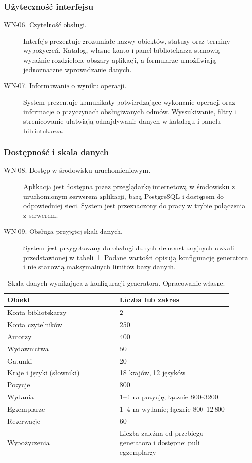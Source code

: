 \documentclass[11pt, a4paper]{article}
\begin{document}
\subsubsection{Użyteczność interfejsu}

\begin{description}
\item[WN-06. Czytelność obsługi.] Interfejs prezentuje zrozumiałe nazwy obiektów, statusy oraz terminy wypożyczeń. Katalog, własne konto i panel bibliotekarza stanowią wyraźnie rozdzielone obszary aplikacji, a formularze umożliwiają jednoznaczne wprowadzanie danych.
\item[WN-07. Informowanie o wyniku operacji.] System prezentuje komunikaty potwierdzające wykonanie operacji oraz informacje o przyczynach obsługiwanych odmów. Wyszukiwanie, filtry i stronicowanie ułatwiają odnajdywanie danych w katalogu i panelu bibliotekarza.
\end{description}

\subsubsection{Dostępność i skala danych}

\begin{description}
\item[WN-08. Dostęp w środowisku uruchomieniowym.] Aplikacja jest dostępna przez przeglądarkę internetową w środowisku z uruchomionym serwerem aplikacji, bazą PostgreSQL i dostępem do odpowiedniej sieci. System jest przeznaczony do pracy w trybie połączenia z serwerem.
\item[WN-09. Obsługa przyjętej skali danych.] System jest przygotowany do obsługi danych demonstracyjnych o skali przedstawionej w tabeli~\ref{tab:rozmiar-bazy}. Podane wartości opisują konfigurację generatora i nie stanowią maksymalnych limitów bazy danych.
\end{description}

\begin{table}[htbp]
\centering
\caption{Skala danych wynikająca z konfiguracji generatora. Opracowanie własne.}
\label{tab:rozmiar-bazy}
\begin{tabular}{@{}p{0.46\linewidth}p{0.46\linewidth}@{}}
\toprule
\textbf{Obiekt} & \textbf{Liczba lub zakres} \\
\midrule
Konta bibliotekarzy & 2 \\
Konta czytelników & 250 \\
Autorzy & 400 \\
Wydawnictwa & 50 \\
Gatunki & 20 \\
Kraje i języki (słowniki) & 18 krajów, 12 języków \\
Pozycje & 800 \\
Wydania & 1--4 na pozycję; łącznie 800--3200 \\
Egzemplarze & 1--4 na wydanie; łącznie 800--12\,800 \\
Rezerwacje & 60 \\
Wypożyczenia & Liczba zależna od przebiegu generatora i dostępnej puli egzemplarzy \\
\bottomrule
\end{tabular}
\end{table}
\end{document}
